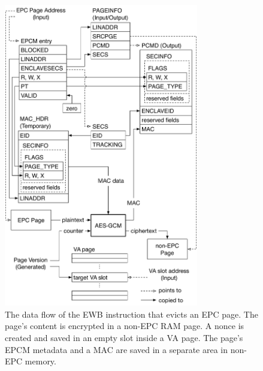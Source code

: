 \begin{figure}[hbt!]
  \centering
  \includegraphics[width=85mm]{figures/sgx_ewb.pdf}
  \caption{
    The data flow of the EWB instruction that evicts an EPC page. The page's
    content is encrypted in a non-EPC RAM page. A nonce is created and saved
    in an empty slot inside a VA page. The page's EPCM metadata and a MAC
    are saved in a separate area in non-EPC memory.
  }
  \label{fig:sgx_ewb}
\end{figure}


